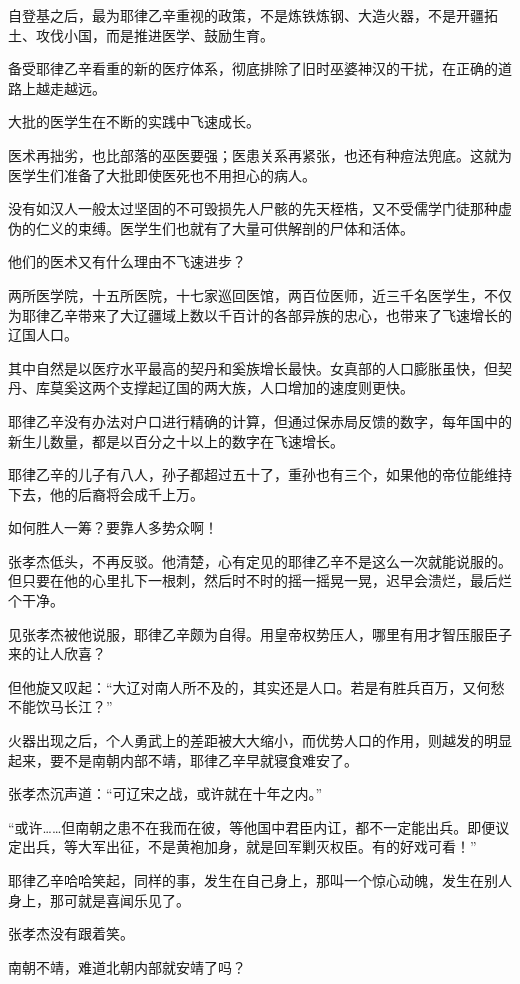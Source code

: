 自登基之后，最为耶律乙辛重视的政策，不是炼铁炼钢、大造火器，不是开疆拓土、攻伐小国，而是推进医学、鼓励生育。

备受耶律乙辛看重的新的医疗体系，彻底排除了旧时巫婆神汉的干扰，在正确的道路上越走越远。

大批的医学生在不断的实践中飞速成长。

医术再拙劣，也比部落的巫医要强；医患关系再紧张，也还有种痘法兜底。这就为医学生们准备了大批即使医死也不用担心的病人。

没有如汉人一般太过坚固的不可毁损先人尸骸的先天桎梏，又不受儒学门徒那种虚伪的仁义的束缚。医学生们也就有了大量可供解剖的尸体和活体。

他们的医术又有什么理由不飞速进步？

两所医学院，十五所医院，十七家巡回医馆，两百位医师，近三千名医学生，不仅为耶律乙辛带来了大辽疆域上数以千百计的各部异族的忠心，也带来了飞速增长的辽国人口。

其中自然是以医疗水平最高的契丹和奚族增长最快。女真部的人口膨胀虽快，但契丹、库莫奚这两个支撑起辽国的两大族，人口增加的速度则更快。

耶律乙辛没有办法对户口进行精确的计算，但通过保赤局反馈的数字，每年国中的新生儿数量，都是以百分之十以上的数字在飞速增长。

耶律乙辛的儿子有八人，孙子都超过五十了，重孙也有三个，如果他的帝位能维持下去，他的后裔将会成千上万。

如何胜人一筹？要靠人多势众啊！

张孝杰低头，不再反驳。他清楚，心有定见的耶律乙辛不是这么一次就能说服的。但只要在他的心里扎下一根刺，然后时不时的摇一摇晃一晃，迟早会溃烂，最后烂个干净。

见张孝杰被他说服，耶律乙辛颇为自得。用皇帝权势压人，哪里有用才智压服臣子来的让人欣喜？

但他旋又叹起：“大辽对南人所不及的，其实还是人口。若是有胜兵百万，又何愁不能饮马长江？”

火器出现之后，个人勇武上的差距被大大缩小，而优势人口的作用，则越发的明显起来，要不是南朝内部不靖，耶律乙辛早就寝食难安了。

张孝杰沉声道：“可辽宋之战，或许就在十年之内。”

“或许……但南朝之患不在我而在彼，等他国中君臣内讧，都不一定能出兵。即便议定出兵，等大军出征，不是黄袍加身，就是回军剿灭权臣。有的好戏可看！”

耶律乙辛哈哈笑起，同样的事，发生在自己身上，那叫一个惊心动魄，发生在别人身上，那可就是喜闻乐见了。

张孝杰没有跟着笑。

南朝不靖，难道北朝内部就安靖了吗？

